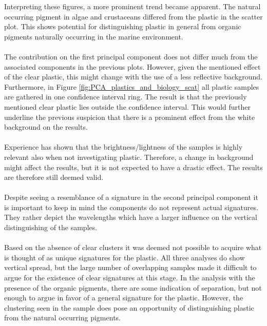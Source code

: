 \noindent
Interpreting these figures, a more prominent trend became apparent. The natural occurring pigment in algae and crustaceans differed from the plastic in the scatter plot. This shows potential for distinguishing plastic in general from organic pigments naturally occurring in the marine environment.
\\\\
The contribution on the first principal component does not differ much from the associated components in the previous plots. However, given the mentioned effect of the clear plastic, this might change with the use of a less reflective background. Furthermore, in Figure \ref{fig:PCA_plastics_and_biology_scat} all plastic samples are gathered in one confidence interval ring. The result is that the previously mentioned clear plastic lies outside the confidence interval. This would further underline the previous suspicion that there is a prominent effect from the white background on the results.
\\\\
Experience has shown that the brightness/lightness of the samples is highly relevant also when not investigating plastic. Therefore, a change in background might affect the results, but it is not expected to have a drastic effect. The results are therefore still deemed valid.
\\\\
Despite seeing a resemblance of a signature in the second principal component it is important to keep in mind the components do not represent actual signatures. They rather depict the wavelengths which have a larger influence on the vertical distinguishing of the samples.
\\\\
Based on the absence of clear clusters it was deemed not possible to acquire what is thought of as unique signatures for the plastic. All three analyses do show vertical spread, but the large number of overlapping samples made it difficult to argue for the existence of clear signatures at this stage. In the analysis with the presence of the organic pigments, there are some indication of separation, but not enough to argue in favor of a general signature for the plastic. However, the clustering seen in the sample does pose an opportunity of distinguishing plastic from the natural occurring pigments. 

